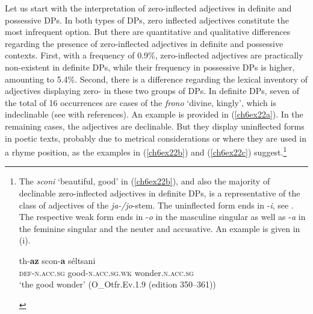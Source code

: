 \documentclass[output=paper,colorlinks,citecolor=brown]{langscibook}
\begin{document}
Let us start with the interpretation of zero-inflected adjectives in
definite and possessive DPs. In both types of DPs, zero inflected
adjectives constitute the most infrequent option. But there are
quantitative and qualitative differences regarding the presence of
zero-inflected adjectives in definite and possessive contexts. First,
with a frequency of 0.9\%, zero-inflected adjectives are practically
non-existent in definite DPs, while their frequency in possessive DPs is
higher, amounting to 5.4\%. Second, there is a difference regarding the
lexical inventory of adjectives displaying zero- in these two
groups of DPs. In definite DPs, seven of the total of 16 occurrences are
cases of the  \emph{frono} `divine, kingly', which is
indeclinable (see \citealp[285]{Braune2018AHD} with references). An example is
provided in (\ref{ch6ex22a}). In the remaining cases, the adjectives are
declinable. But they display uninflected forms in poetic texts, probably
due to metrical considerations or where they are used in a rhyme position,
as the examples in (\ref{ch6ex22b}) and (\ref{ch6ex22c}) suggest.\footnote{The  \emph{sconi}
  `beautiful, good' in (\ref{ch6ex22b}), and also the majority of declinable
  zero-inflected adjectives in definite DPs, is a representative of the
  class of adjectives of the \emph{ja-/jo}-stem. The uninflected form
  ends in -\emph{i}, see \citet[289]{Braune2018AHD}. The respective weak form
  ends in -\emph{o} in the masculine  singular as well as
  -\emph{a} in the feminine  singular and the neuter  and
  accusative. An example is given in (i). 
  
\begin{exe}
\label{ch6exi}\gll th-\textbf{az} scon-\textbf{a} séltsani \\
\textsc{def-n.acc.sg} good-\textsc{n.acc.sg.wk} wonder.\textsc{n.acc.sg}\\
\glt `the good wonder' (O\_Otfr.Ev.1.9 (edition 350--361))
\end{exe}}
\end{document}
